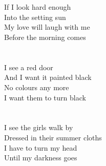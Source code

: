 {\\\noindent\vbox{~\\
If I look hard enough\\
Into the setting sun\\
My love will laugh with me\\
Before the morning comes}\\
\\\noindent\vbox{~\\
I see a red door\\
And I want it painted black\\
No colours any more\\
I want them to turn black}\\
\\\noindent\vbox{~\\
I see the girls walk by\\
Dressed in their summer cloths\\
I have to turn my head\\
Until my darkness goes}
}


